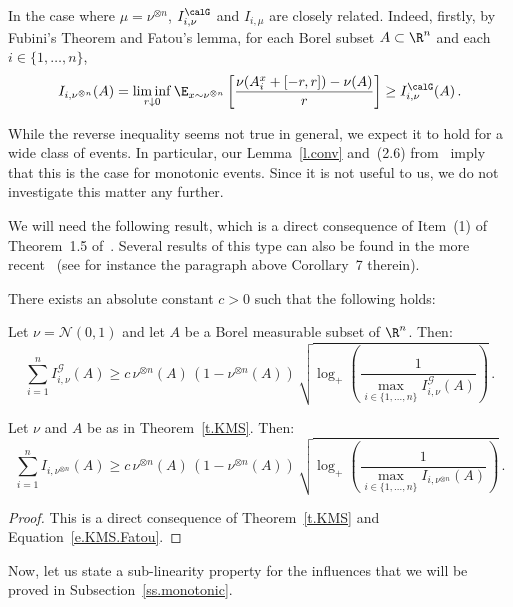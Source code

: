 In the case where $\mu=\nu^{\otimes n}$, $I^\calG_{i,\nu}$ and $I_{i,\mu}$ are closely related. Indeed, firstly, by Fubini's Theorem and Fatou's lemma, for each Borel subset $A\subset\R^n$ and each $i\in\{1,\dots,n\}$,
\begin{equation}\label{e.KMS.Fatou}
I_{i,\nu^{\otimes n}}(A)=\liminf_{r\downarrow 0} \E_{x \sim \nu^{\otimes n}} \left[\frac{\nu(A_i^x+[-r,r]) - \nu(A)}{r} \right]\geq I^\calG_{i,\nu}(A) \,.
\end{equation}

While the reverse inequality seems not true in general, we expect it to hold for a wide class of events. In particular, our Lemma~\ref{l.conv} and~(2.6) from~\cite{keller2012geometric} imply that this is the case for monotonic events. Since it is not useful to us, we do not investigate this matter any further.

We will need the following result, which is a direct consequence of Item~(1) of Theorem~1.5 of~\cite{keller2012geometric}. Several results of this type can also be found in the more recent~\cite{cordero2012hypercontractive} (see for instance the paragraph above Corollary~7 therein).

\begin{theo}\label{t.KMS}
There exists an absolute constant $c > 0$ such that the following holds:

Let $\nu = \mathcal{N}(0,1)$ and let $A$ be a Borel measurable subset of $\R^n$. Then:
\[
\sum_{i=1}^n I^\mathcal{G}_{i,\nu}(A) \geq c \, \nu^{\otimes n}(A) \, (1-\nu^{\otimes n}(A)) \, \sqrt{\log_+ \left(\frac{1}{\max_{i \in \lbrace 1,\dots, n \rbrace} I^\mathcal{G}_{i,\nu}(A)}\right) } \,.
\]
\end{theo}

\begin{coro}\label{c.KMS}
Let $\nu$ and $A$ be as in Theorem~\ref{t.KMS}. Then:
\[
\sum_{i=1}^n I_{i,\nu^{\otimes n}}(A) \geq c \, \nu^{\otimes n}(A) \, (1-\nu^{\otimes n}(A)) \, \sqrt{\log_+ \left(\frac{1}{\max_{i \in \lbrace 1,\dots, n \rbrace} I_{i,\nu^{\otimes n}}(A)}\right) } \,.
\]
\end{coro}

\begin{proof}
This is a direct consequence of Theorem~\ref{t.KMS} and Equation~\eqref{e.KMS.Fatou}.
\end{proof}

Now, let us state a sub-linearity property for the influences that we will be proved in Subsection~\ref{ss.monotonic}.

